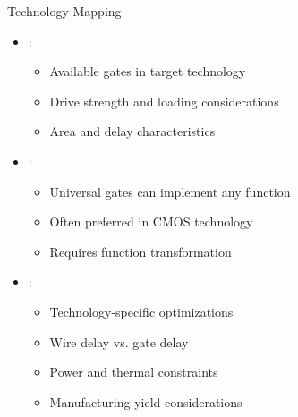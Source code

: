 \begin{frame}{Technology Mapping}
\begin{itemize}
\item {}:
\begin{itemize}
\item Available gates in target technology
\item Drive strength and loading considerations
\item Area and delay characteristics
\end{itemize}
\vspace{0.5cm}
\item {}:
\begin{itemize}
\item Universal gates can implement any function
\item Often preferred in CMOS technology
\item Requires function transformation
\end{itemize}
\vspace{0.5cm}
\item {}:
\begin{itemize}
\item Technology-specific optimizations
\item Wire delay vs. gate delay
\item Power and thermal constraints
\item Manufacturing yield considerations
\end{itemize}
\end{itemize}
\end{frame}

